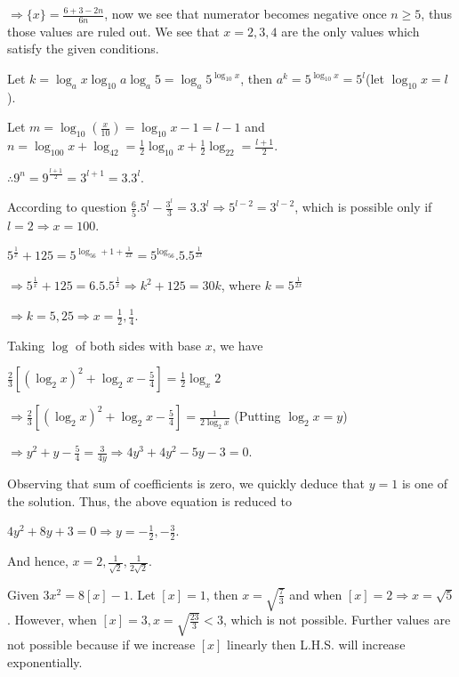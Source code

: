   $\Rightarrow \{x\} = \frac{6 + 3 - 2n}{6n}$, now we see that numerator becomes negative once $n \geq 5$,
  thus those values are ruled out. We see that $x = 2, 3, 4$ are the only values which satisfy the given
  conditions.
\item Let $k = \log_ax\log_{10}a\log_a5 = \log_a5^{\log_{10}x}$, then $a^k = 5^{\log_{10}x} = 5^l$(let
  $\log_{10}x = l$).

  Let $m = \log_{10}\left(\frac{x}{10}\right) = \log_{10}x - 1 = l - 1$ and $n = \log_{100}x + \log_42 =
  \frac{1}{2}\log_{10}x + \frac{1}{2}\log_22 = \frac{l + 1}{2}$.

  $\therefore 9^n = 9^{\frac{l + 1}{2}} = 3^{l + 1} = 3.3^l$.

  According to question $\frac{6}{5}.5^l - \frac{3^l}{3} = 3.3^l\Rightarrow 5^{l - 2} = 3^{l - 2}$, which is
  possible only if $l = 2 \Rightarrow x = 100$.
\item $5^{\frac{1}{x}} + 125 = 5^{\log_56 + 1 + \frac{1}{2x}} = 5^{\log_56}.5.5^{\frac{1}{2x}}$

  $\Rightarrow 5^{\frac{1}{x}} + 125 = 6.5.5^{\frac{1}{x}} \Rightarrow k^2 + 125 = 30k$, where $k =
  5^{\frac{1}{2x}}$

  $\Rightarrow k = 5, 25 \Rightarrow x = \frac{1}{2}, \frac{1}{4}$.
\item Taking $\log$ of both sides with base $x$, we have

  $\tfrac{2}{3}\left[(\log_2x)^2 + \log_2x - \tfrac{5}{4}\right] = \frac{1}{2}\log_x2$

  $\Rightarrow \frac{2}{3}\left[(\log_2x)^2 + \log_2x - \frac{5}{4}\right] = \frac{1}{2\log_2x}$ (Putting $\log_2x = y$)

  $\Rightarrow y^2 + y - \frac{5}{4} = \frac{3}{4y} \Rightarrow 4y^3 + 4y^2 - 5y - 3 = 0$.

  Observing that sum of coefficients is zero, we quickly deduce that $y = 1$ is one of the solution. Thus,
  the above equation is reduced to

  $4y^2 + 8y + 3 = 0 \Rightarrow y = -\frac{1}{2}, -\frac{3}{2}$.

  And hence, $x = 2, \frac{1}{\sqrt{2}}, \frac{1}{2\sqrt{2}}$.
\item Given $3x^2 = 8[x] - 1$. Let $[x] = 1$, then $x = \sqrt{\frac{7}{3}}$ and when $[x] = 2 \Rightarrow x
  = \sqrt{5}$. However, when $[x] = 3, x = \sqrt{\frac{23}{3}} < 3$, which is not possible. Further values
  are not possible because if we increase $[x]$ linearly then L.H.S. will increase exponentially.

